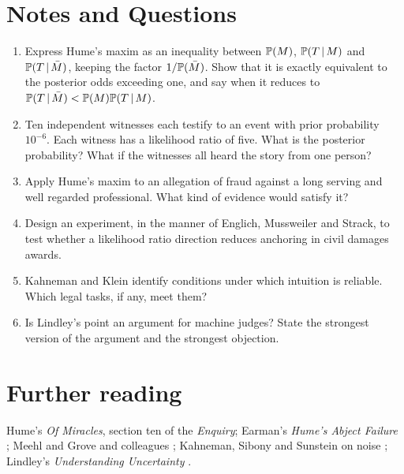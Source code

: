 \section*{Notes and Questions}
\begin{enumerate}[label=\arabic*.]
\item Express Hume's maxim as an inequality between $\mathbb{P}(M)$, $\mathbb{P}(T\,\vert\, M)$ and $\mathbb{P}(T\,\vert\, \bar M)$, keeping the factor $1/\mathbb{P}(\bar M)$. Show that it is exactly equivalent to the posterior odds exceeding one, and say when it reduces to $\mathbb{P}(T\,\vert\,\bar M)<\mathbb{P}(M)\mathbb{P}(T\,\vert\, M)$.
\item Ten independent witnesses each testify to an event with prior probability $10^{-6}$. Each witness has a likelihood ratio of five. What is the posterior probability? What if the witnesses all heard the story from one person?
\item Apply Hume's maxim to an allegation of fraud against a long serving and well regarded professional. What kind of evidence would satisfy it?
\item Design an experiment, in the manner of Englich, Mussweiler and Strack, to test whether a likelihood ratio direction reduces anchoring in civil damages awards.
\item Kahneman and Klein identify conditions under which intuition is reliable. Which legal tasks, if any, meet them?
\item Is Lindley's point an argument for machine judges? State the strongest version of the argument and the strongest objection.
\end{enumerate}

\section*{Further reading}
Hume's \emph{Of Miracles}, section ten of the \emph{Enquiry}; Earman's \emph{Hume's Abject Failure} \citep{earman2000}; Meehl \citep{meehl1954} and Grove and colleagues \citep{grove2000}; Kahneman, Sibony and Sunstein on noise \citep{kahneman2021}; Lindley's \emph{Understanding Uncertainty} \citep{lindley2006}.
